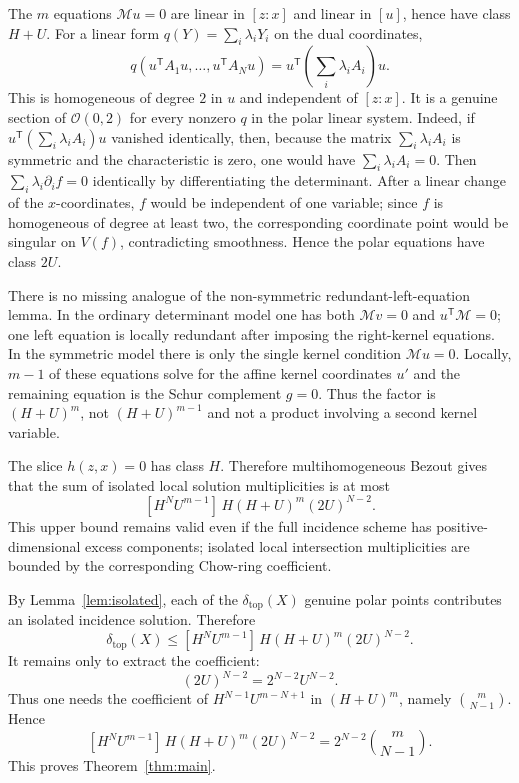 \documentclass[11pt]{article}
\theoremstyle{plain}
\theoremstyle{definition}
\newcommand{\OO}{\mathcal O}
\newcommand{\Mcal}{\mathcal M}
\newcommand{\pdeg}{\delta}
\begin{document}
The $m$ equations $\Mcal u=0$ are linear in $[z:x]$ and linear in $[u]$, hence
have class $H+U$.  For a linear form
$q(Y)=\sum_i\lambda_iY_i$ on the dual coordinates,
\[
  q(u^{\mathsf T}A_1u,\ldots,u^{\mathsf T}A_Nu)
  =u^{\mathsf T}\left(\sum_i\lambda_iA_i\right)u.
\]
This is homogeneous of degree $2$ in $u$ and independent of $[z:x]$.  It is a
genuine section of $\OO(0,2)$ for every nonzero $q$ in the polar linear system.
Indeed, if $u^{\mathsf T}(\sum_i\lambda_iA_i)u$ vanished identically, then,
because the matrix $\sum_i\lambda_iA_i$ is symmetric and the characteristic is
zero, one would have $\sum_i\lambda_iA_i=0$.  Then
$\sum_i\lambda_i\partial_i f=0$ identically by differentiating the determinant.
After a linear change of the $x$-coordinates, $f$ would be independent of one
variable; since $f$ is homogeneous of degree at least two, the corresponding
coordinate point would be singular on $V(f)$, contradicting smoothness.  Hence
the polar equations have class $2U$.

There is no missing analogue of the non-symmetric redundant-left-equation
lemma.  In the ordinary determinant model one has both $\Mcal v=0$ and
$u^{\mathsf T}\Mcal=0$; one left equation is locally redundant after imposing
the right-kernel equations.  In the symmetric model there is only the single
kernel condition $\Mcal u=0$.  Locally, $m-1$ of these equations solve for the
affine kernel coordinates $u'$ and the remaining equation is the Schur
complement $g=0$.  Thus the factor is $(H+U)^m$, not $(H+U)^{m-1}$ and not a
product involving a second kernel variable.

The slice $h(z,x)=0$ has class $H$.  Therefore multihomogeneous Bezout gives
that the sum of isolated local solution multiplicities is at most
\begin{equation}
\label{eq:bezoutproduct}
  [H^N U^{m-1}]\,H(H+U)^m(2U)^{N-2}.
\end{equation}
This upper bound remains valid even if the full incidence scheme has positive-
dimensional excess components; isolated local intersection multiplicities are
bounded by the corresponding Chow-ring coefficient.

By Lemma~\ref{lem:isolated}, each of the $\pdeg_{\mathrm{top}}(X)$ genuine polar
points contributes an isolated incidence solution.  Therefore
\[
  \pdeg_{\mathrm{top}}(X)
  \le [H^N U^{m-1}]\,H(H+U)^m(2U)^{N-2}.
\]
It remains only to extract the coefficient:
\[
  (2U)^{N-2}=2^{N-2}U^{N-2}.
\]
Thus one needs the coefficient of $H^{N-1}U^{m-N+1}$ in $(H+U)^m$, namely
$\binom{m}{N-1}$.  Hence
\[
  [H^N U^{m-1}]\,H(H+U)^m(2U)^{N-2}
  =2^{N-2}\binom{m}{N-1}.
\]
This proves Theorem~\ref{thm:main}.
\end{document}
